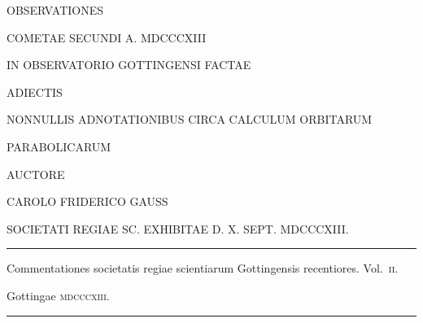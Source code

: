 \thispagestyle{empty}
\begin{center}\vspace*{.45in}
{\Large OBSERVATIONES}\par\bigskip
{\LARGE COMETAE SECUNDI A. MDCCCXIII}\par\bigskip
IN OBSERVATORIO GOTTINGENSI FACTAE\par\bigskip
ADIECTIS\par\bigskip
NONNULLIS ADNOTATIONIBUS CIRCA CALCULUM ORBITARUM\par\medskip
PARABOLICARUM\par\bigskip
AUCTORE\par\bigskip
{\large CAROLO FRIDERICO GAUSS}\par\bigskip
SOCIETATI REGIAE SC. EXHIBITAE D. X. SEPT. MDCCCXIII.\par\vfill
\rule{.75\linewidth}{.3pt}\par\smallskip
Commentationes societatis regiae scientiarum Gottingensis recentiores. Vol.~\textsc{ii}.\par
Gottingae \textsc{mdcccxiii}.\par\smallskip
\rule{.75\linewidth}{.3pt}
\end{center}\clearpage
